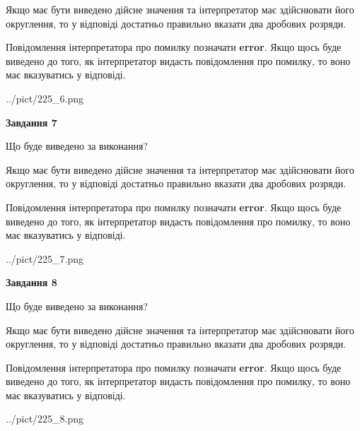 \documentclass[12pt, ukrainian]{article}
\begin{document}
{\begin {Large}
Якщо має бути виведено дійсне значення та інтерпретатор має здійснювати його округлення, 
то у відповіді достатньо правильно вказати два дробових розряди.

Повідомлення інтерпретатора про помилку позначати \textbf{error}.
Якщо щось буде виведено до того, як інтерпретатор видасть повідомлення про помилку, 
то воно має вказуватись у відповіді. \par

\begin{center}
	{../pict/225_6.png}
\end{center}
\newpage

{\begin {center}\textbf{Завдання 7}\end {center}}\par
Що буде виведено за виконання? \par

Якщо має бути виведено дійсне значення та інтерпретатор має здійснювати його округлення, 
то у відповіді достатньо правильно вказати два дробових розряди.

Повідомлення інтерпретатора про помилку позначати \textbf{error}.
Якщо щось буде виведено до того, як інтерпретатор видасть повідомлення про помилку, 
то воно має вказуватись у відповіді. \par

\begin{center}
	{../pict/225_7.png}
\end{center}
\newpage

{\begin {center}\textbf{Завдання 8}\end {center}}\par
Що буде виведено за виконання? \par

Якщо має бути виведено дійсне значення та інтерпретатор має здійснювати його округлення, 
то у відповіді достатньо правильно вказати два дробових розряди.

Повідомлення інтерпретатора про помилку позначати \textbf{error}.
Якщо щось буде виведено до того, як інтерпретатор видасть повідомлення про помилку, 
то воно має вказуватись у відповіді. \par

\begin{center}
	{../pict/225_8.png}
\end{center}
\newpage


\end{Large}}
\end{document}
